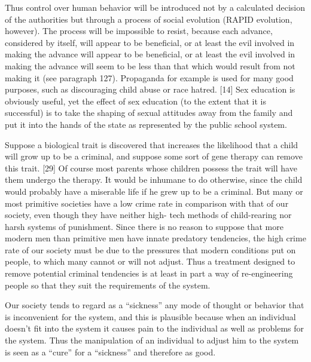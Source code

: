 Thus control over human behavior will be introduced not by a calculated decision of the authorities but through a process of social evolution (RAPID evolution, however). The process will be impossible to resist, because each advance, considered by itself, will appear to be beneficial, or at least the evil involved in making the advance will appear to be beneficial, or at least the evil involved in making the advance will seem to be less than that which would result from not making it (see paragraph 127). Propaganda for example is used for many good purposes, such as discouraging child abuse or race hatred. [14] Sex education is obviously useful, yet the effect of sex education (to the extent that it is successful) is to take the shaping of sexual attitudes away from the family and put it into the hands of the state as represented by the public school system.

 Suppose a biological trait is discovered that increases the likelihood that a child will grow up to be a criminal, and suppose some sort of gene therapy can remove this trait. [29] Of course most parents whose children possess the trait will have them undergo the therapy. It would be inhumane to do otherwise, since the child would probably have a miserable life if he grew up to be a criminal. But many or most primitive societies have a low crime rate in comparison with that of our society, even though they have neither high- tech methods of child-rearing nor harsh systems of punishment. Since there is no reason to suppose that more modern men than primitive men have innate predatory tendencies, the high crime rate of our society must be due to the pressures that modern conditions put on people, to which many cannot or will not adjust. Thus a treatment designed to remove potential criminal tendencies is at least in part a way of re-engineering people so that they suit the requirements of the system.

 Our society tends to regard as a “sickness” any mode of thought or behavior that is inconvenient for the system, and this is plausible because when an individual doesn’t fit into the system it causes pain to the individual as well as problems for the system. Thus the manipulation of an individual to adjust him to the system is seen as a “cure” for a “sickness” and therefore as good.

